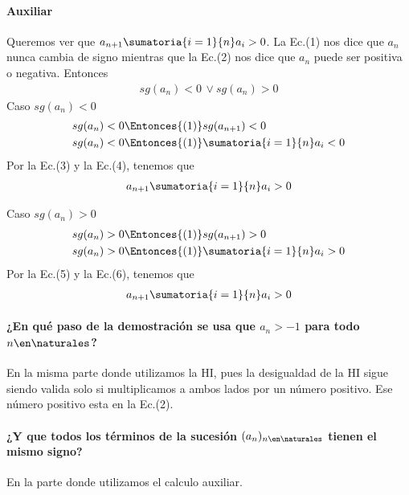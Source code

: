 \begin{enumerate}[label=\roman*)]
        \paragraph{Auxiliar}{Queremos ver que $a_{n+1}\sumatoria{i=1}{n} a_i > 0$}. La Ec.(1) nos dice que $a_n$ nunca cambia de
        signo mientras que la Ec.(2) nos dice que $a_n$ puede ser positiva o negativa. Entonces
        \begin{align*}
          sg(a_n) < 0 \, \lor sg(a_n) > 0
        \end{align*}
        Caso $sg(a_n) < 0 $
        \begin{align}
          sg(a_n) < 0 & \Entonces{(1)} sg(a_{n+1}) < 0            \\
          sg(a_n) < 0 & \Entonces{(1)} \sumatoria{i=1}{n} a_i < 0
        \end{align}
        Por la Ec.(3) y la Ec.(4), tenemos que
        \begin{align*}
          a_{n+1}\sumatoria{i=1}{n} a_i > 0
        \end{align*}

        Caso $sg(a_n) > 0 $
        \begin{align}
          sg(a_n) > 0 & \Entonces{(1)} sg(a_{n+1}) > 0            \\
          sg(a_n) > 0 & \Entonces{(1)} \sumatoria{i=1}{n} a_i > 0
        \end{align}
        Por la Ec.(5) y la Ec.(6), tenemos que
        \begin{align*}
          a_{n+1}\sumatoria{i=1}{n} a_i > 0
        \end{align*}

        \paragraph{¿En qué paso de la demostración se usa que $a_n > -1$ para todo $n \en \naturales $? }{En la misma parte
          donde utilizamos la HI, pues la desigualdad de la HI sigue siendo valida solo si multiplicamos a ambos lados por un
          número positivo. Ese número positivo esta en la Ec.(2).}

        \paragraph{¿Y que todos los términos de la sucesión $(a_n)_{n \en \naturales }$ tienen el mismo signo?}{En la parte
          donde utilizamos el calculo auxiliar.}


\end{enumerate}
